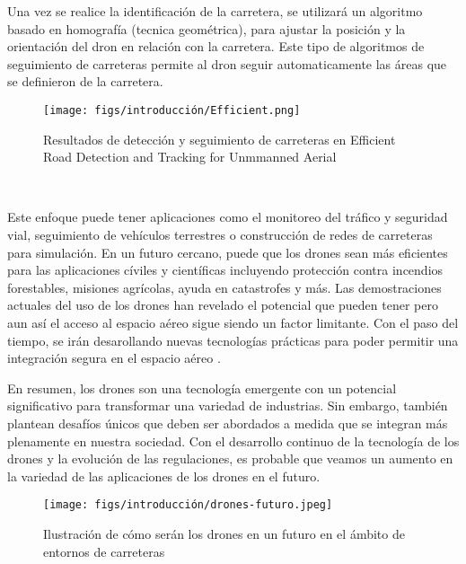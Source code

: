 Una vez se realice la identificación de la carretera, se utilizará un algoritmo basado en homografía (tecnica geométrica), para ajustar la posición y la orientación del dron
en relación con la carretera. Este tipo de algoritmos de seguimiento de carreteras permite al dron seguir automaticamente las áreas que se definieron de la carretera. \newline

\begin{figure} [H]
  \begin{center}
    \texttt{[image: figs/introducción/Efficient.png]}
  \end{center}
  \caption{Resultados de detección y seguimiento de carreteras en Efficient Road Detection and Tracking for Unmmanned Aerial \cite{article}}
  \label{fig:Efficient}
\end{figure}\

Este enfoque puede tener aplicaciones como el monitoreo del tráfico y seguridad vial, seguimiento de vehículos terrestres o construcción de redes de carreteras para simulación. En un futuro cercano, puede que los drones sean más eficientes para las aplicaciones cíviles y científicas incluyendo protección contra incendios forestables, misiones agrícolas, 
ayuda en catastrofes y más. 
Las demostraciones actuales del uso de los drones han revelado el potencial que pueden tener pero aun así el acceso al espacio aéreo sigue siendo un factor limitante. Con el paso del 
tiempo, se irán desarollando nuevas tecnologías prácticas para poder permitir una integración segura en el espacio aéreo \cite{KrejciGarzon_2014}. \newline

En resumen, los drones son una tecnología emergente con un potencial significativo para transformar una variedad de industrias. Sin embargo, también plantean desafíos
únicos que deben ser abordados a medida que se integran más plenamente en nuestra sociedad. Con el desarrollo continuo de la tecnología de los drones y la evolución de las
regulaciones, es probable que veamos un aumento en la variedad de las aplicaciones de los drones en el futuro. \newline

\begin{figure} [H]
  \begin{center}
    \texttt{[image: figs/introducción/drones-futuro.jpeg]}
  \end{center}
  \caption{Ilustración de cómo serán los drones en un futuro en el ámbito de entornos de carreteras}
  \label{fig:DronesFuturo}
\end{figure}\

